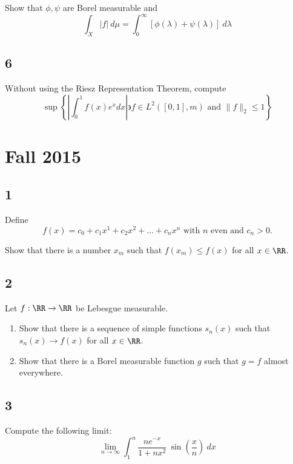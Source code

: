 Show that \(\phi, \psi\) are Borel measurable and \[
\int_{X}|f| ~d \mu=\int_{0}^{\infty}[\phi(\lambda)+\psi(\lambda)] ~d \lambda
\]

\hypertarget{section-5}{%
\subsection{6}\label{section-5}}

Without using the Riesz Representation Theorem, compute \[
\sup \left\{\left|\int_{0}^{1} f(x) e^{x} d x\right| \backepsilon f \in L^{2}([0,1], m) \text{ and } \|f\|_{2} \leq 1\right\}
\]

\hypertarget{fall-2015}{%
\section{Fall 2015}\label{fall-2015}}

\hypertarget{section}{%
\subsection{1}\label{section}}

Define \[
f(x)=c_{0}+c_{1} x^{1}+c_{2} x^{2}+\ldots+c_{n} x^{n} \text { with } n \text { even and } c_{n}>0.
\]

Show that there is a number \(x_m\) such that \(f(x_m) \leq f(x)\) for
all \(x\in \RR\).

\hypertarget{section-1}{%
\subsection{2}\label{section-1}}

Let \(f: \RR \to \RR\) be Lebesgue measurable.

\begin{enumerate}
\def\labelenumi{\arabic{enumi}.}
\tightlist
\item
  Show that there is a sequence of simple functions \(s_n(x)\) such that
  \(s_n(x) \to f(x)\) for all \(x\in \RR\).
\item
  Show that there is a Borel measurable function \(g\) such that
  \(g = f\) almost everywhere.
\end{enumerate}

\hypertarget{section-2}{%
\subsection{3}\label{section-2}}

Compute the following limit: \[
\lim _{n \rightarrow \infty} \int_{1}^{n} \frac{n e^{-x}}{1+n x^{2}} ~\sin \left(\frac x n\right) ~d x
\]

